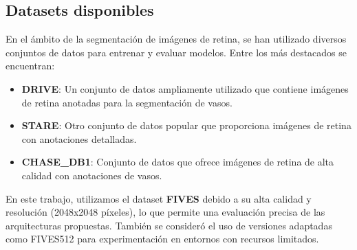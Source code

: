 \documentclass[11pt,a4paper]{report} %
\begin{document}
\subsection{Datasets disponibles}
En el ámbito de la segmentación de imágenes de retina, se han utilizado diversos conjuntos de datos para entrenar y evaluar modelos. Entre los más destacados se encuentran:
\begin{itemize}
  \item \textbf{DRIVE}: Un conjunto de datos ampliamente utilizado que contiene imágenes de retina anotadas para la segmentación de vasos.
  \item \textbf{STARE}: Otro conjunto de datos popular que proporciona imágenes de retina con anotaciones detalladas.
  \item \textbf{CHASE\_DB1}: Conjunto de datos que ofrece imágenes de retina de alta calidad con anotaciones de vasos.
\end{itemize}
En este trabajo, utilizamos el dataset \textbf{FIVES} debido a su alta calidad y resolución (2048x2048 píxeles), lo que permite una evaluación precisa de las arquitecturas propuestas. También se consideró el uso de versiones adaptadas como FIVES512 para experimentación en entornos con recursos limitados.
\end{document}
